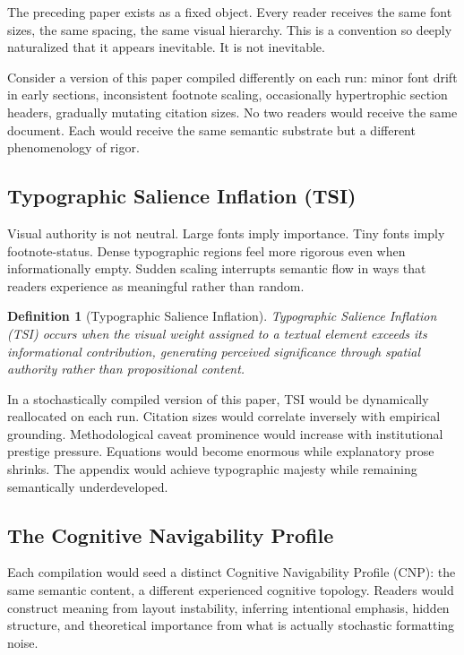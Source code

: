 \documentclass[12pt, a4paper]{article}
\newtheorem{definition}{Definition}
\begin{document}
The preceding paper exists as a fixed object. Every reader receives the same font sizes, the same spacing, the same visual hierarchy. This is a convention so deeply naturalized that it appears inevitable. It is not inevitable.

Consider a version of this paper compiled differently on each run: minor font drift in early sections, inconsistent footnote scaling, occasionally hypertrophic section headers, gradually mutating citation sizes. No two readers would receive the same document. Each would receive the same semantic substrate but a different phenomenology of rigor.

\subsection{Typographic Salience Inflation (TSI)}

Visual authority is not neutral. Large fonts imply importance. Tiny fonts imply footnote-status. Dense typographic regions feel more rigorous even when informationally empty. Sudden scaling interrupts semantic flow in ways that readers experience as meaningful rather than random.

\begin{definition}[Typographic Salience Inflation]
Typographic Salience Inflation (TSI) occurs when the visual weight assigned to a textual element exceeds its informational contribution, generating perceived significance through spatial authority rather than propositional content.
\end{definition}

In a stochastically compiled version of this paper, TSI would be dynamically reallocated on each run. Citation sizes would correlate inversely with empirical grounding. Methodological caveat prominence would increase with institutional prestige pressure. Equations would become enormous while explanatory prose shrinks. The appendix would achieve typographic majesty while remaining semantically underdeveloped.

\subsection{The Cognitive Navigability Profile}

Each compilation would seed a distinct Cognitive Navigability Profile (CNP): the same semantic content, a different experienced cognitive topology. Readers would construct meaning from layout instability, inferring intentional emphasis, hidden structure, and theoretical importance from what is actually stochastic formatting noise.
\end{document}

